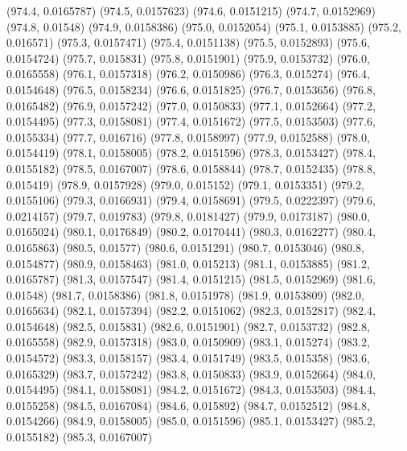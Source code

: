 {					(974.4, 0.0165787)
					(974.5, 0.0157623)
					(974.6, 0.0151215)
					(974.7, 0.0152969)
					(974.8, 0.01548)
					(974.9, 0.0158386)
					(975.0, 0.0152054)
					(975.1, 0.0153885)
					(975.2, 0.016571)
					(975.3, 0.0157471)
					(975.4, 0.0151138)
					(975.5, 0.0152893)
					(975.6, 0.0154724)
					(975.7, 0.015831)
					(975.8, 0.0151901)
					(975.9, 0.0153732)
					(976.0, 0.0165558)
					(976.1, 0.0157318)
					(976.2, 0.0150986)
					(976.3, 0.015274)
					(976.4, 0.0154648)
					(976.5, 0.0158234)
					(976.6, 0.0151825)
					(976.7, 0.0153656)
					(976.8, 0.0165482)
					(976.9, 0.0157242)
					(977.0, 0.0150833)
					(977.1, 0.0152664)
					(977.2, 0.0154495)
					(977.3, 0.0158081)
					(977.4, 0.0151672)
					(977.5, 0.0153503)
					(977.6, 0.0155334)
					(977.7, 0.016716)
					(977.8, 0.0158997)
					(977.9, 0.0152588)
					(978.0, 0.0154419)
					(978.1, 0.0158005)
					(978.2, 0.0151596)
					(978.3, 0.0153427)
					(978.4, 0.0155182)
					(978.5, 0.0167007)
					(978.6, 0.0158844)
					(978.7, 0.0152435)
					(978.8, 0.015419)
					(978.9, 0.0157928)
					(979.0, 0.015152)
					(979.1, 0.0153351)
					(979.2, 0.0155106)
					(979.3, 0.0166931)
					(979.4, 0.0158691)
					(979.5, 0.0222397)
					(979.6, 0.0214157)
					(979.7, 0.019783)
					(979.8, 0.0181427)
					(979.9, 0.0173187)
					(980.0, 0.0165024)
					(980.1, 0.0176849)
					(980.2, 0.0170441)
					(980.3, 0.0162277)
					(980.4, 0.0165863)
					(980.5, 0.01577)
					(980.6, 0.0151291)
					(980.7, 0.0153046)
					(980.8, 0.0154877)
					(980.9, 0.0158463)
					(981.0, 0.015213)
					(981.1, 0.0153885)
					(981.2, 0.0165787)
					(981.3, 0.0157547)
					(981.4, 0.0151215)
					(981.5, 0.0152969)
					(981.6, 0.01548)
					(981.7, 0.0158386)
					(981.8, 0.0151978)
					(981.9, 0.0153809)
					(982.0, 0.0165634)
					(982.1, 0.0157394)
					(982.2, 0.0151062)
					(982.3, 0.0152817)
					(982.4, 0.0154648)
					(982.5, 0.015831)
					(982.6, 0.0151901)
					(982.7, 0.0153732)
					(982.8, 0.0165558)
					(982.9, 0.0157318)
					(983.0, 0.0150909)
					(983.1, 0.015274)
					(983.2, 0.0154572)
					(983.3, 0.0158157)
					(983.4, 0.0151749)
					(983.5, 0.015358)
					(983.6, 0.0165329)
					(983.7, 0.0157242)
					(983.8, 0.0150833)
					(983.9, 0.0152664)
					(984.0, 0.0154495)
					(984.1, 0.0158081)
					(984.2, 0.0151672)
					(984.3, 0.0153503)
					(984.4, 0.0155258)
					(984.5, 0.0167084)
					(984.6, 0.015892)
					(984.7, 0.0152512)
					(984.8, 0.0154266)
					(984.9, 0.0158005)
					(985.0, 0.0151596)
					(985.1, 0.0153427)
					(985.2, 0.0155182)
					(985.3, 0.0167007)
}
